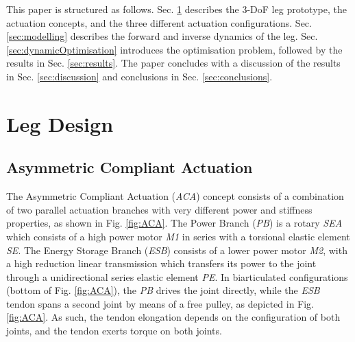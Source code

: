 \documentclass[letterpaper, 10 pt, conference]{ieeeconf}  %
\begin{document}
This paper is structured as follows. Sec. \ref{sec:legDesign} describes the 3-DoF leg prototype, the actuation concepts, and the three different actuation configurations. Sec. \ref{sec:modelling} describes the forward and inverse dynamics of the leg. Sec. \ref{sec:dynamicOptimisation} introduces the optimisation problem, followed by the results in Sec. \ref{sec:results}. The paper concludes with a discussion of the results in Sec. \ref{sec:discussion} and conclusions in Sec. \ref{sec:conclusions}.


\section{Leg Design}
\label{sec:legDesign}

\subsection{Asymmetric Compliant Actuation}
\label{subsec:ACA}
The Asymmetric Compliant Actuation (\textit{ACA}) concept consists of a combination of two parallel actuation branches with very different power and stiffness properties, as shown in Fig. \ref{fig:ACA}. The Power Branch (\textit{PB}) is a rotary \textit{SEA} which consists of a high power motor \textit{M1} in series with a torsional elastic element \textit{SE}. The Energy Storage Branch (\textit{ESB}) consists of a lower power motor \textit{M2}, with a high reduction linear transmission which transfers its power to the joint through a unidirectional series elastic element \textit{PE}. In biarticulated configurations (bottom of Fig. \ref{fig:ACA}), the \textit{PB} drives the joint directly, while the \textit{ESB} tendon spans a second joint by means of a free pulley, as depicted in Fig. \ref{fig:ACA}. As such, the tendon elongation depends on the configuration of both joints, and the tendon exerts torque on both joints.
\end{document}
